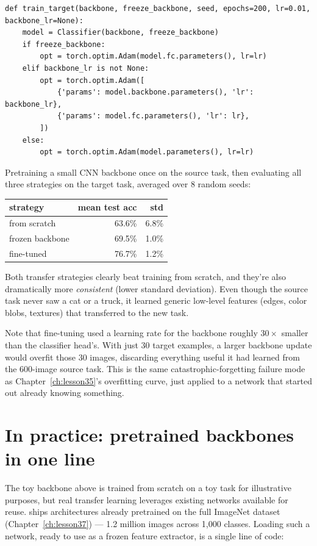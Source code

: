 \begin{lstlisting}
def train_target(backbone, freeze_backbone, seed, epochs=200, lr=0.01, backbone_lr=None):
    model = Classifier(backbone, freeze_backbone)
    if freeze_backbone:
        opt = torch.optim.Adam(model.fc.parameters(), lr=lr)
    elif backbone_lr is not None:
        opt = torch.optim.Adam([
            {'params': model.backbone.parameters(), 'lr': backbone_lr},
            {'params': model.fc.parameters(), 'lr': lr},
        ])
    else:
        opt = torch.optim.Adam(model.parameters(), lr=lr)
\end{lstlisting}

Pretraining a small CNN backbone once on the source task, then evaluating all three strategies on the target task, averaged over 8 random seeds:

\begin{center}
\renewcommand{\arraystretch}{1.3}
\begin{tabular}{lrr}
\hline
\textbf{strategy} & \textbf{mean test acc} & \textbf{std} \\
\hline
from scratch    & 63.6\% & 6.8\% \\
frozen backbone & 69.5\% & 1.0\% \\
fine-tuned      & 76.7\% & 1.2\% \\
\hline
\end{tabular}
\end{center}

Both transfer strategies clearly beat training from scratch, and they're also dramatically more \emph{consistent} (lower standard deviation). Even though the source task never saw a cat or a truck, it learned generic low-level features (edges, color blobs, textures) that transferred to the new task.

Note that fine-tuning used a learning rate for the backbone roughly $30\times$ smaller than the classifier head's. With just 30 target examples, a larger backbone update would overfit those 30 images, discarding everything useful it had learned from the 600-image source task. This is the same catastrophic-forgetting failure mode as Chapter~\ref{ch:lesson35}'s overfitting curve, just applied to a network that started out already knowing something.

\section{In practice: pretrained backbones in one line}

The toy backbone above is trained from scratch on a toy task for illustrative purposes, but real transfer learning leverages existing networks available for reuse.  ships architectures already pretrained on the full ImageNet dataset (Chapter~\ref{ch:lesson37}) --- 1.2 million images across 1,000 classes. Loading such a network, ready to use as a frozen feature extractor, is a single line of code:

